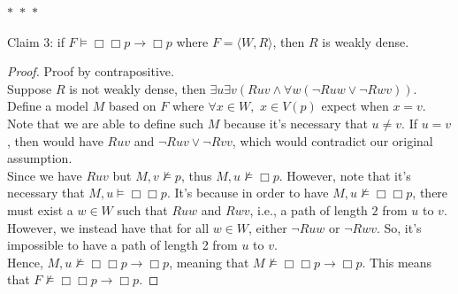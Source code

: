\documentclass[12pt]{article}
\newcommand{\B}{\Box}
\newcommand{\s}{\vDash}
\newcommand{\ns}{\nvDash}
\begin{document}
\noindent
\begin{center}
    $\ast$~$\ast$~$\ast$
\end{center}
Claim 3: if $F \vDash \B \B p \rightarrow \B p$ where $F = \langle W, R \rangle$, then $R$ is weakly dense. 
\begin{proof} Proof by contrapositive.\\
    Suppose $R$ is not weakly dense, then $\exists u \exists v (Ruv \land \forall w(\neg Ruw \lor \neg Rwv))$.
    Define a model $M$ based on $F$ where $\forall x \in W,$ $x \in V(p)$ expect when $x = v$.
    Note that we are able to define such $M$ because it's necessary that $u \neq v$. If $u = v$, then would have $Ruv$ and $\neg Ruv \lor \neg Rvv$, which would contradict our original assumption.\\
    Since we have $Ruv$ but $M, v \ns p$, thus $M, u \ns \B p$.
    However, note that it's necessary that $M, u \s \B \B p$.
    It's because in order to have $M, u \ns \B \B p$, there must exist a $w \in W$ such that $Ruw$ and $Rwv$, i.e., a path of length $2$ from $u$ to $v$.
    However, we instead have that for all $w \in W$, either $\neg Ruw$ or $\neg Rwv$.
    So, it's impossible to have a path of length 2 from $u$ to $v$.\\
    Hence, $M, u \ns \B \B p \to \B p$, meaning that $M \ns \B \B p \to \B p$.
    This means that $F \ns \B \B p \to \B p$.

\end{proof}
\end{document}
